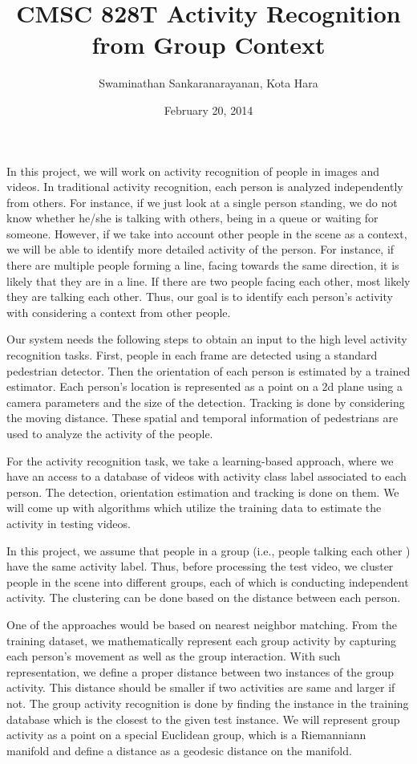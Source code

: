 \documentclass{article}   %
\begin{document}
\title{CMSC 828T Activity Recognition from Group Context}   %
\author{Swaminathan Sankaranarayanan, Kota Hara}         %
\date{February 20, 2014}    %
\maketitle

In this project, we will work on activity recognition of people in images and videos. In traditional activity recognition, each person is analyzed independently from others. For instance, if we just look at a single person standing, we do not know whether he/she is talking with others, being in a queue or waiting for someone. However, if we take into account other people in the scene as a context, we will be able to identify more detailed activity of the person. For instance, if there are multiple people forming a line, facing towards the same direction, it is likely that they are in a line. If there are two people facing each other, most likely they are talking each other. Thus, our goal is to identify each person's activity with considering a context from other people.

Our system needs the following steps to obtain an input to the high level activity recognition tasks. First, people in each frame are detected using a standard pedestrian detector. Then the orientation of each person is estimated by a trained estimator. Each person's location is represented as a point on a 2d plane using a camera parameters and the size of the detection. Tracking is done by considering the moving distance. These spatial and temporal information of pedestrians are used to analyze the activity of the people.

For the activity recognition task, we take a learning-based approach, where we have an access to a database of videos with activity class label associated to each person. The detection, orientation estimation and tracking is done on them. We will come up with algorithms which utilize the training data to estimate the activity in testing videos. 

In this project, we assume that people in a group (i.e., people talking each other ) have the same activity label. Thus, before processing the test video, we cluster people in the scene into different groups, each of which is conducting independent activity. The clustering can be done based on the distance between each person. 

One of the approaches would be based on nearest neighbor matching. From the training dataset, we mathematically represent each group activity by capturing each person's movement as well as the group interaction. With such representation, we define a proper distance between two instances of the group activity. This distance should be smaller if two activities are same and larger if not. The group activity recognition is done by finding the instance in the training database which is the closest to the given test instance. We will represent group activity as a point on a special Euclidean group, which is a Riemanniann manifold and define a distance as a geodesic distance on the manifold.
\end{document}
